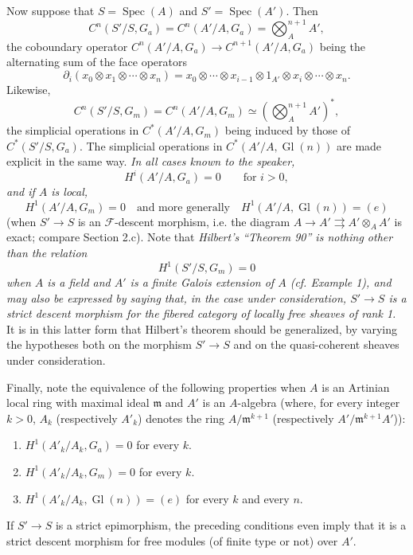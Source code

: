 Now suppose that $S=\operatorname{Spec}(A)$ and
$S'=\operatorname{Spec}(A')$. Then
\[
  C^n(S'/S,G_a)=C^n(A'/A,G_a)=\bigotimes_A^{n+1}A',
\]
the coboundary operator
$C^n(A'/A,G_a)\longrightarrow C^{n+1}(A'/A,G_a)$ being the alternating sum of
the face operators
\[
  \partial_i(x_0\otimes x_1\otimes\cdots\otimes x_n)
  =x_0\otimes\cdots\otimes x_{i-1}\otimes1_{A'}\otimes
   x_i\otimes\cdots\otimes x_n.
\]
Likewise,
\[
  C^n(S'/S,G_m)=C^n(A'/A,G_m)
  \simeq\left(\bigotimes_A^{n+1}A'\right)^*,
\]
the simplicial operations in $C^*(A'/A,G_m)$ being induced by those of
$C^*(S'/S,G_a)$. The simplicial operations in
$C^*(A'/A,\operatorname{Gl}(n))$ are made explicit in the same way.
\emph{In all cases known to the speaker,}
\[
  H^i(A'/A,G_a)=0\qquad\text{for $i>0$},
\]
\emph{and if $A$ is local,}
\[
  H^1(A'/A,G_m)=0
  \quad\text{and more generally}\quad
  H^1(A'/A,\operatorname{Gl}(n))=(e)
\]
(when $S'\longrightarrow S$ is an $\mathcal F$-descent morphism, i.e. the
diagram
$A\longrightarrow A'\rightrightarrows A'\otimes_AA'$ is exact; compare
Section 2.c). Note that \emph{Hilbert's “Theorem 90” is nothing other than the
relation}
\[
  H^1(S'/S,G_m)=0
\]
\emph{when $A$ is a field and $A'$ is a finite Galois extension of $A$
(cf. Example 1), and may also be expressed by saying that, in the case under
consideration, $S'\longrightarrow S$ is a strict descent morphism for the
fibered category of locally free sheaves of rank 1.} It is in this latter form
that Hilbert's theorem should be generalized, by varying the hypotheses both
on the morphism $S'\longrightarrow S$ and on the quasi-coherent sheaves under
consideration.

Finally, note the equivalence of the following properties when $A$ is an
Artinian local ring with maximal ideal $\mathfrak m$ and $A'$ is an
$A$-algebra (where, for every integer $k>0$, $A_k$ (respectively $A'_k$)
denotes the ring $A/\mathfrak m^{k+1}$ (respectively
$A'/\mathfrak m^{k+1}A'$)):
\begin{enumerate}
\item[(i)] $H^1(A'_k/A_k,G_a)=0$ for every $k$.
\item[(ii)] $H^1(A'_k/A_k,G_m)=0$ for every $k$.
\item[(iii)] $H^1(A'_k/A_k,\operatorname{Gl}(n))=(e)$ for every $k$ and every
$n$.
\end{enumerate}
If $S'\longrightarrow S$ is a strict epimorphism, the preceding conditions
even imply that it is a strict descent morphism for free modules (of finite
type or not) over $A'$.


